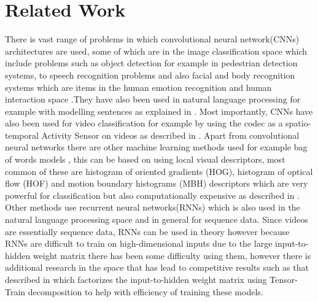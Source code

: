 \section{Related Work}
There is vast range of problems in which convolutional neural network(CNNs) architectures are used, some of which are in the image classification space which include problems such as object detection for example in pedestrian detection \citep{TomeD2016DCNN} systems, to speech  recognition problems and also facial and body recognition systems which are items in the human emotion recognition and human interaction space \cite{knyazev2017convolutional} .They have also been used in natural language processing for example with modelling sentences as explained in \cite{Kalchbrenner_2014}. 
Most importantly, CNNs have also been used for video classification for example by using the codec as a spatio-temporal Activity Sensor on videos as described in \citep{ChadhaA2017VCWC}. Apart from convolutional neural networks there are other machine learning methods used for example bag of words models \citep{10.1007978-3-642-28493-9_34}, this can be based on using local visual descriptors, most common of these are histogram of oriented gradients (HOG), histogram of optical flow (HOF) and motion boundary histograms (MBH) descriptors which are very powerful for classification but also computationally expensive as described in \citep{Uijlings2015}. Other methods use recurrent neural networks(RNNs) which is also used in the natural language processing space and in general for sequence data. Since videos are essentially sequence data, RNNs can be used in theory however because RNNs are difficult to train on high-dimensional inputs due to the large input-to-hidden weight matrix there has been some difficulty using them, however there is additional research in the space that has lead to competitive results such as that described in \citep{yang2017tensortrain} which factorizes the input-to-hidden weight matrix using Tensor-Train decomposition to help with efficiency of training these models.
